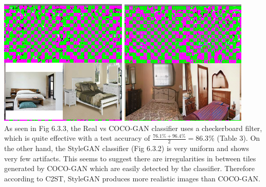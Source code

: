 \documentclass[10pt]{article}
\begin{document}
\begin{multicols*}{2}
        \includegraphics[scale=0.3]{smoothgrad/coco/real.png}
        \includegraphics[scale=0.3]{smoothgrad/coco/coco.png}\\
        As seen in Fig 6.3.3, the Real vs COCO-GAN classifier uses a checkerboard filter, which is quite effective with a test accuracy of $\frac{76.1\% + 96.4\%}{2} = 86.3\%$ (Table 3). 
        On the other hand, the StyleGAN classifier (Fig 6.3.2) is very uniform and shows very few artifacts.
        This seems to suggest there are irregularities in between tiles generated by COCO-GAN which are easily detected by the classifier.
        Therefore according to C2ST, StyleGAN produces more realistic images than COCO-GAN.
    \end{multicols*}
    \newpage
\end{document}
